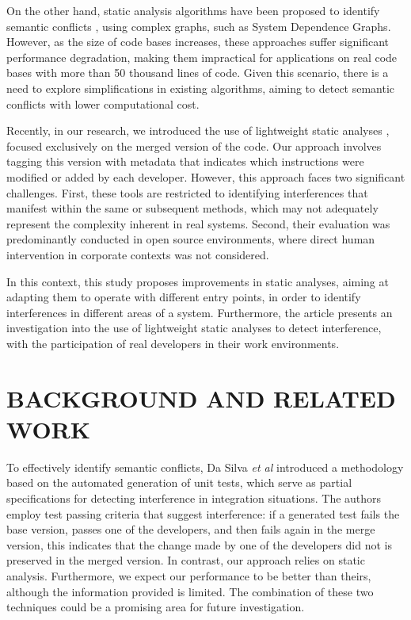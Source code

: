 \documentclass[sigconf,review]{acmart}
\begin{document}
On the other hand, static analysis algorithms have been proposed to identify semantic conflicts \cite{barros2017using, binkley1995program, Horwitz1989IntegratingNV}, using complex graphs, such as System Dependence Graphs. However, as the size of code bases increases, these approaches suffer significant performance degradation, making them impractical for applications on real code bases with more than 50 thousand lines of code. Given this scenario, there is a need to explore simplifications in existing algorithms, aiming to detect semantic conflicts with lower computational cost.

Recently, in our research, we introduced the use of lightweight static analyses \cite{galileu}, focused exclusively on the merged version of the code. Our approach involves tagging this version with metadata that indicates which instructions were modified or added by each developer. However, this approach faces two significant challenges. First, these tools are restricted to identifying interferences that manifest within the same or subsequent methods, which may not adequately represent the complexity inherent in real systems. Second, their evaluation was predominantly conducted in open source environments, where direct human intervention in corporate contexts was not considered.

In this context, this study proposes improvements in static analyses, aiming at adapting them to operate with different entry points, in order to identify interferences in different areas of a system. Furthermore, the article presents an investigation into the use of lightweight static analyses to detect interference, with the participation of real developers in their work environments.

\section{BACKGROUND AND RELATED WORK}

To effectively identify semantic conflicts, Da Silva \emph{et al} \cite{silva2022detecting} introduced a methodology based on the automated generation of unit tests, which serve as partial specifications for detecting interference in integration situations. The authors employ test passing criteria that suggest interference: if a generated test fails the base version, passes one of the developers, and then fails again in the merge version, this indicates that the change made by one of the developers did not is preserved in the merged version. In contrast, our approach relies on static analysis. Furthermore, we expect our performance to be better than theirs, although the information provided is limited. The combination of these two techniques could be a promising area for future investigation.
\end{document}
